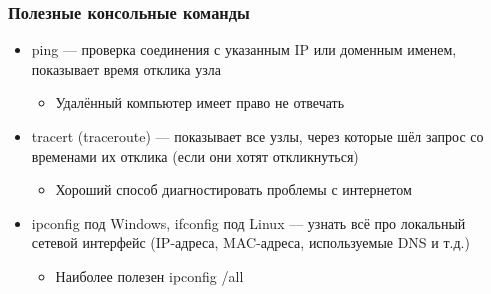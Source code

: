 \documentclass{../../slides-style}
\begin{document}
    \begin{frame}
        \frametitle{Полезные консольные команды}
        \begin{itemize}
            \item ping --- проверка соединения с указанным IP или доменным именем, показывает время отклика узла
            \begin{itemize}
                \item Удалённый компьютер имеет право не отвечать
            \end{itemize}
            \item tracert (traceroute) --- показывает все узлы, через которые шёл запрос со временами их отклика (если они хотят откликнуться)
            \begin{itemize}
                \item Хороший способ диагностировать проблемы с интернетом
            \end{itemize}
            \item ipconfig под Windows, ifconfig под Linux --- узнать всё про локальный сетевой интерфейс (IP-адреса, MAC-адреса, используемые DNS и т.д.)
            \begin{itemize}
                \item Наиболее полезен ipconfig /all
            \end{itemize}
        \end{itemize}
    \end{frame}
\end{document}
